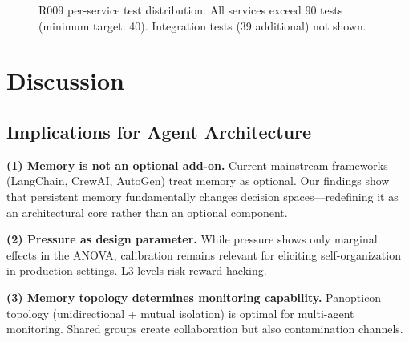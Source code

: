 \documentclass[11pt, a4paper]{article}
\begin{document}
\begin{figure}[H]
\centering
{}
\caption{R009 per-service test distribution. All services exceed 90 tests (minimum target: 40). Integration tests (39 additional) not shown.}
\label{fig:perservice}
\end{figure}

\section{Discussion}

\subsection{Implications for Agent Architecture}

\textbf{(1) Memory is not an optional add-on.} Current mainstream frameworks (LangChain, CrewAI, AutoGen) treat memory as optional. Our findings show that persistent memory fundamentally changes decision spaces---redefining it as an architectural core rather than an optional component.

\textbf{(2) Pressure as design parameter.} While pressure shows only marginal effects in the ANOVA, calibration remains relevant for eliciting self-organization in production settings. L3 levels risk reward hacking.

\textbf{(3) Memory topology determines monitoring capability.} Panopticon topology (unidirectional + mutual isolation) is optimal for multi-agent monitoring. Shared groups create collaboration but also contamination channels.
\end{document}
